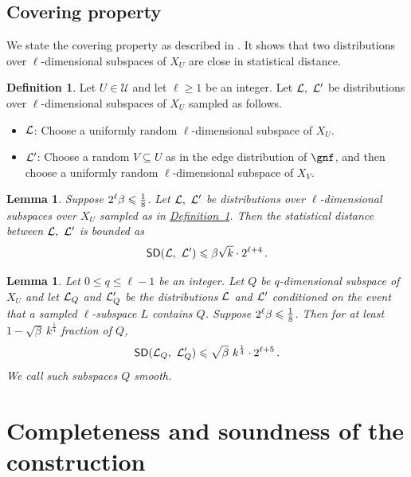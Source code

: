 \documentclass[11pt]{article}
\numberwithin{equation}{section}
\newtheorem{lemma}[theorem]{Lemma}
\theoremstyle{definition}
\newtheorem{definition}[theorem]{Definition}
\theoremstyle{plain}
\newcommand{\expref}[2]{\hyperref[#2]{#1~\ref{#2}}}
\newcommand\eigth{{1\over8}}
\renewcommand\geq{\geqslant}
\renewcommand\leq{\leqslant}
\renewcommand\subset{\subseteq}
\def\U{\mathcal{U}}
\def\V{\mathcal{V}}
\begin{document}
%
%
%
\subsection{Covering property}\label{section:covering}

We state the covering property as described in \cite[Lemmas 4.6, 4.7]{KMS}.
It shows that two distributions over $\ell$-dimensional subspaces of $X_U$ are
close in statistical distance.
\begin{definition}\label{def:covering_dist}
Let $U\in\U$ and let $\ell \geq 1$ be an integer. Let ${\cal L}, ~{\cal L}'$ be distributions over $\ell$-dimensional subspaces of $X_{U}$ sampled as follows.
\begin{itemize}
\item ${\cal L}$: Choose  a uniformly random $\ell$-dimensional subspace of $X_{U}$.
\item ${\cal L'}$: Choose a random $V\subset U$ as in the edge distribution of $\gnf$, and then choose a uniformly random $\ell$-dimensional subspace of $X_{V}$.
\end{itemize}
\end{definition}

\begin{lemma}\label{lemma:covering_normal}
Suppose $2^{\ell}\beta \leqslant \eigth$. Let ${\cal L}, ~{\cal L}'$ be distributions over $\ell$-dimensional subspaces over $X_{U}$
 sampled as in \expref{Definition}{def:covering_dist}. Then the statistical
distance between ${\cal L}, ~{\cal L}'$ is bounded as
$$
{\sf SD}({\cal L}, ~{\cal L}')\leqslant  \beta \sqrt{k}\cdot 2^{\ell+4}\,. $$ %
\end{lemma}


\begin{lemma}\label{lemma:covering_cond_markov}
Let $0 \leq q \leq \ell-1$ be an integer. Let $Q$ be
$q$-dimensional subspace of $X_{U}$ and let ${\cal L}_Q$ and ${\cal
  L}'_Q$ be the
distributions ${\cal L}$ and ${\cal L}'$ conditioned on the event that a sampled $\ell$-subspace $L$ contains $Q$.
Suppose $2^{\ell}\beta \leqslant \eigth$. Then for at least $1 - \sqrt{\beta}~k^{\frac{1}{4}} $
fraction of $Q$,
\begin{equation}\label{eq:SD_cond_Q}
{\sf SD}  ({\cal L}_Q, ~{\cal L}'_Q ) \leqslant \sqrt{\beta} ~k^{\frac{1}{4}} \cdot 2^{\ell+5}\,.
\end{equation}
We call such subspaces $Q$ {\em smooth}.
\end{lemma}
\section{Completeness and soundness of the construction}
\def\V{{\cal V}}
\def\D{{\cal D}}
\def\Vsat{\V_{sat}}
\def\eq{{\sf Eq}}
\end{document}
